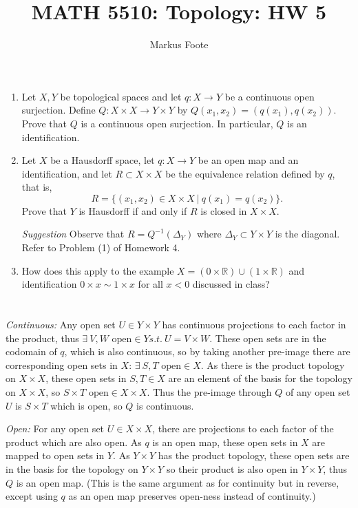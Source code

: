 \documentclass{jhwhw}
\title{MATH 5510: Topology: HW 5}
\author{Markus Foote}
\newcommand{\R}{{\mathbb R}}
\begin{document}
\problem{}%
\begin{enumerate}
	
	\item Let $X,Y$ be topological spaces and let $q:X\to Y$ be a continuous open surjection. Define 
	$Q:X\times X \to Y\times Y$ by  $Q(x_1,x_2) = (q(x_1),q(x_2)).$  
	Prove that $Q$ is a continuous open surjection.  In particular, $Q$ is an identification.
	\item Let $X$ be a Hausdorff space, let $q:X\to Y$ be an open map and an identification, and let $R\subset X\times X$ be the equivalence relation defined by $q$, that is,
	$$
	R = \{ (x_1,x_2)\in X\times X \ | \ q(x_1) = q(x_2) \}.
	$$
	Prove that $Y$ is Hausdorff if and only if $R$  is closed in $X\times X$. 
	
	\noindent\emph{Suggestion} Observe that  $R = Q^{-1}(\Delta_Y)$ where $\Delta_Y\subset Y\times Y$ is the diagonal.  Refer to Problem (1) of Homework 4.
	
	\item How does this apply to the example $X =( 0\times\R )\cup (1\times \R)$ and identification $0\times x \sim 1\times x$ for all $x<0$ discussed in class?
\end{enumerate}
\solution{}
\part{}%
\textit{Continuous:} Any open set $U \in Y\times Y$ has continuous projections to each factor in the product, thus $\exists\ V,W \text{ open} \in Y s.t.\ U=V\times W$. These open sets are in the codomain of $q$, which is also continuous, so by taking another pre-image there are corresponding open sets in $X$: $\exists\ S,T \text{ open} \in X$. As there is the product topology on $X\times X$, these open sets in $S,T\in X$ are an element of the basis for the topology on $X\times X$, so $S\times T \text{ open} \in X\times X$. Thus the pre-image through $Q$ of any open set $U$ is $S\times T$ which is open, so $Q$ is continuous.

 \textit{Open:} For any open set $U \in X\times X$, there are projections to each factor of the product which are also open. As $q$ is an open map, these open sets in $X$ are mapped to open sets in $Y$. As $Y\times Y$ has the product topology, these open sets are in the basis for the topology on $Y\times Y$ so their product is also open in $Y\times Y$, thus $Q$ is an open map. (This is the same argument as for continuity but in reverse, except using $q$ as an open map preserves open-ness instead of continuity.)
\end{document}
